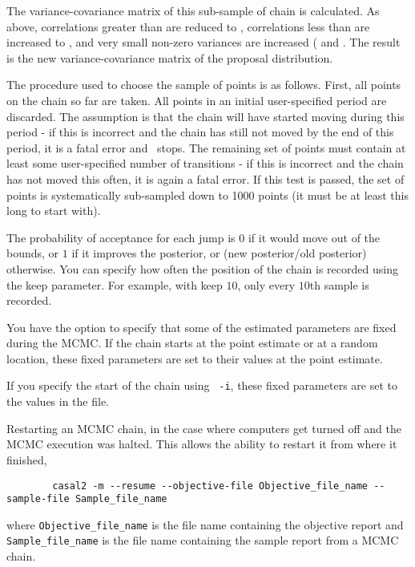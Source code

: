 The variance-covariance matrix of this sub-sample of chain is calculated. As above, correlations greater than  are reduced to , correlations less than  are increased to  , and very small non-zero variances are increased ( and . The result is the new variance-covariance matrix of the proposal distribution.

The procedure used to choose the sample of points is as follows. First, all points on the chain so far are taken. All points in an initial user-specified period are discarded. The assumption is that the chain will have started moving during this period - if this is incorrect and the chain has still not moved by the end of this period, it is a fatal error and \CNAME\ stops. The remaining set of points must contain at least some user-specified number of transitions - if this is incorrect and the chain has not moved this often, it is again a fatal error. If this test is passed, the set of points is systematically sub-sampled down to 1000 points (it must be at least this long to start with).

The probability of acceptance for each jump is $0$ if it would move out of the bounds, or $1$ if it improves the posterior, or (new posterior/old posterior) otherwise. You can specify how often the position of the chain is recorded using the keep parameter. For example, with keep $10$, only every $10$th sample is recorded.

You have the option to specify that some of the estimated parameters are fixed during the MCMC. If the chain starts at the point estimate or at a random location, these fixed parameters are set to their values at the point estimate.

If you specify the start of the chain using \texttt{\cname\ -i}, these fixed parameters are set to the values in the file.

Restarting an MCMC chain, in the case where computers get turned off and the MCMC execution was halted. This allows the ability to restart it from where it finished,

{\small{\begin{verbatim}
		casal2 -m --resume --objective-file Objective_file_name --sample-file Sample_file_name
		\end{verbatim}}}
where \texttt{Objective\_file\_name} is the file name containing the objective report and \texttt{Sample\_file\_name} is the file name containing the sample report from a MCMC chain.

